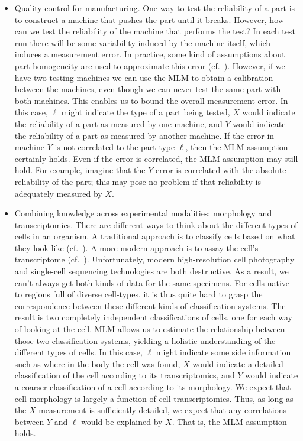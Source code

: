 \begin{itemize}
    \item Quality control for manufacturing.   One way to test the reliability of a part is to construct a machine that pushes the part until it breaks.  However, how can we test the reliability of the machine that performs the test?  In each test run there will be some variability induced by the machine itself, which induces a measurement error.  In practice, some kind of assumptions about part homogeneity are used to approximate this error (cf.\ \cite{de2005gauge}).  However, if we have two testing machines we can use the MLM to obtain a calibration between the machines, even though we can never test the same part with both machines.  This enables us to bound the overall measurement error.  In this case, $\ell$ might indicate the type of a part being tested, $X$ would indicate the reliability of a part as measured by one machine, and $Y$ would indicate the reliability of a part as measured by another machine.  If the error in machine $Y$ is not correlated to the part type $\ell$, then the MLM assumption certainly holds.  Even if the error is correlated, the MLM assumption may still hold.  For example, imagine that the $Y$ error is correlated with the absolute reliability of the part; this may pose no problem if that reliability is adequately measured by $X$.  

    \item Combining knowledge across experimental modalities: morphology and transcriptomics.  There are different ways to think about the different types of cells in an organism.  A traditional approach is to classify cells based on what they look like (cf.\ \cite{steinman1973identification,bloomfield1982physiological}).  A more modern approach is to assay the cell's transcriptome (cf.\ \citep{tasic2017shared}).  Unfortunately, modern high-resolution cell photography and single-cell sequencing technologies are both destructive.  As a result, we can't always get both kinds of data for the same specimens.  For cells native to regions full of diverse cell-types, it is thus quite hard to grasp the correspondence between these different kinds of classification systems.  The result is two completely independent classifications of cells, one for each way of looking at the cell.  MLM allows us to estimate the relationship between those two classification systems, yielding a holistic understanding of the different types of cells.  In this case, $\ell$ might indicate some side information such as where in the body the cell was found, $X$ would indicate a detailed classification of the cell according to its transcriptomics, and $Y$ would indicate a coarser classification of a cell according to its morphology.  We expect that cell morphology is largely a function of cell transcriptomics.  Thus, as long as the $X$ measurement is sufficiently detailed, we expect that any correlations between $Y$ and $\ell$ would be explained by $X$.  That is, the MLM assumption holds.  


\end{itemize}
